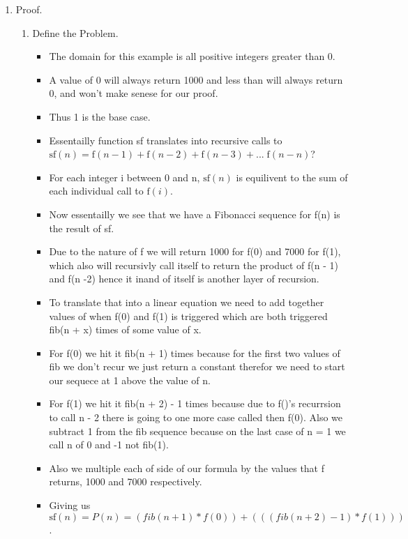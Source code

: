 \documentclass{article}
\begin{document}
\begin{enumerate}
\begin{enumerate}
      \item Proof.        
      \begin{enumerate}
        \item Define the Problem.
          \begin{itemize}
            \item The domain for this example is all positive integers greater than 0. 
            \item A value of 0 will always return 1000 and less than will always return 0, and won't make senese for our proof.
            \item Thus 1 is the base case.
            \item Essentailly function sf translates into recursive calls to $\textrm{sf}(n) = \textrm{f}(n - 1) + \textrm{f}(n - 2) + \textrm{f}(n - 3) + ...\;\textrm{f}(n - n)$?
            \item For each integer i between 0 and n, $\textrm{sf}(n)$ is equilivent to the sum of each individual call to $\textrm{f}(i)$.
            \item Now essentailly we see that we have a Fibonacci sequence for f(n) is the result of sf.
            \item Due to the nature of f we will return 1000 for f(0) and 7000 for f(1), which also will recursivly call itself to return the product of f(n - 1) and f(n -2) hence it inand of itself is another layer of recursion. 
            \item To translate that into a linear equation we need to add together values of when f(0) and f(1) is triggered which are both triggered fib(n + x) times of some value of x.
            \item For f(0) we hit it fib(n + 1) times because for the first two values of fib we don't recur we just return a constant therefor we need to start our sequece at 1 above the value of n.
            \item For f(1) we hit it fib(n + 2) - 1 times because due to f()'s recurrsion to call n - 2 there is going to one more case called then f(0). Also we subtract 1 from the fib sequence because on the last case of n = 1 we call n of 0 and -1 not fib(1).
            \item Also we multiple each of side of our formula by the values that f returns, 1000 and 7000 respectively.
            \item Giving us $\textrm{sf}(n) = P(n) = (fib(n + 1) * f(0)) + (((fib(n + 2) - 1) * f(1)))$.
          \end{itemize}
        

\end{enumerate}
\end{enumerate}
\end{enumerate}
\end{document}
